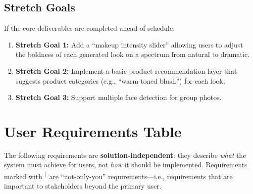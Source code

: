 \documentclass[11pt, letterpaper]{article}
\begin{document}
\subsection{Stretch Goals}
If the core deliverables are completed ahead of schedule:
\begin{enumerate}[leftmargin=*]
    \item \textbf{Stretch Goal 1:} Add a ``makeup intensity slider'' allowing users to adjust the boldness of each generated look on a spectrum from natural to dramatic.
    \item \textbf{Stretch Goal 2:} Implement a basic product recommendation layer that suggests product categories (e.g., ``warm-toned blush'') for each look.
    \item \textbf{Stretch Goal 3:} Support multiple face detection for group photos.
\end{enumerate}

\newpage
\section{User Requirements Table}

The following requirements are \textbf{solution-independent}: they describe \emph{what} the system must achieve for users, not \emph{how} it should be implemented. Requirements marked with \textsuperscript{$\dagger$} are ``not-only-you'' requirements---i.e., requirements that are important to stakeholders beyond the primary user.
\end{document}

